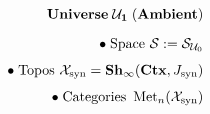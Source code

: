 \documentclass[preview]{standalone}
\begin{document}
\begin{align*}
\special{dvisvgm:raw <g id='unique000'>}\mathbf{Universe\;\mathcal{U}_1\;(Ambient)}\\[6pt]\bullet\;\text{Space }\mathcal{S} := \mathcal{S}_{\mathcal{U}_0}\\[4pt]\bullet\;\text{Topos }\mathcal{X}_{\text{syn}} = \mathbf{Sh}_\infty(\mathbf{Ctx}, J_{\text{syn}})\\[4pt]\bullet\;\text{Categories }\operatorname{Met}_n(\mathcal{X}_{\text{syn}})\special{dvisvgm:raw </g>}
\end{align*}
\end{document}
